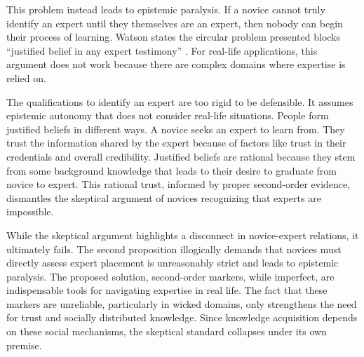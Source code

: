 \documentclass[12pt, a4paper, twoside]{article}
\begin{document}
This problem instead leads to epistemic paralysis. If a novice cannot truly identify an expert until they themselves are an expert, then nobody can begin their process of learning. Watson states the circular problem presented blocks “justified belief in any expert testimony” \autocite[p.\ 138]{watson2022fixing}. For real-life applications, this argument does not work because there are complex domains where expertise is relied on.

The qualifications to identify an expert are too rigid to be defensible. It assumes epistemic autonomy that does not consider real-life situations. People form justified beliefs in different ways. A novice seeks an expert to learn from. They trust the information shared by the expert because of factors like trust in their credentials and overall credibility. Justified beliefs are rational because they stem from some background knowledge that leads to their desire to graduate from novice to expert. This rational trust, informed by proper second-order evidence, dismantles the skeptical argument of novices recognizing that experts are impossible.

While the skeptical argument highlights a disconnect in novice-expert relations, it ultimately fails. The second proposition illogically demands that novices must directly assess expert placement is unreasonably strict and leads to epistemic paralysis. The proposed solution, second-order markers, while imperfect, are indispensable tools for navigating expertise in real life. The fact that these markers are unreliable, particularly in wicked domains, only strengthens the need for trust and socially distributed knowledge. Since knowledge acquisition depends on these social mechanisms, the skeptical standard collapses under its own premise.

\nocite{*}
\printbibliography
\end{document}
